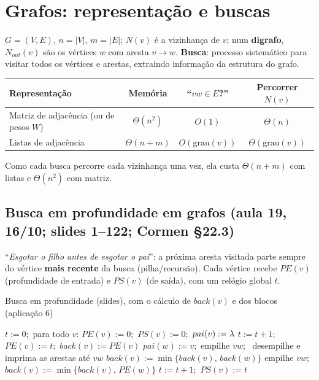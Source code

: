 \section{Grafos: representação e buscas}\label{sec:buscas}
$G=(V,E)$, $n=|V|$, $m=|E|$; $N(v)$ é a vizinhança de $v$; num \textbf{digrafo}, $N_{out}(v)$ são os vértices $w$ com aresta $v\to w$. \textbf{Busca}: processo sistemático para visitar todos os vértices e arestas, extraindo informação da estrutura do grafo.
\begin{center}\small
\begin{tabular}{@{}lccc@{}}
\toprule
Representação & Memória & ``$vw\in E$?'' & Percorrer $N(v)$\\
\midrule
Matriz de adjacência (ou de pesos $W$) & $\Theta(n^2)$ & $O(1)$ & $\Theta(n)$\\
Listas de adjacência & $\Theta(n+m)$ & $O(\text{grau}(v))$ & $\Theta(\text{grau}(v))$\\
\bottomrule
\end{tabular}
\end{center}
Como cada busca percorre cada vizinhança uma vez, ela custa $\Theta(n+m)$ com listas e $\Theta(n^2)$ com matriz.

\subsection{Busca em profundidade em grafos (aula 19, 16/10; slides 1--122; Cormen §22.3)}\label{sec:dfs}
``\emph{Esgotar o filho antes de esgotar o pai}'': a próxima aresta visitada parte sempre do vértice \textbf{mais recente} da busca (pilha/recursão). Cada vértice recebe $PE(v)$ (profundidade de entrada) e $PS(v)$ (de saída), com um relógio global $t$.
\begin{pseudo}{Busca em profundidade (slides), com o cálculo de $back(v)$ e dos blocos (aplicação 6)}
\begin{algorithmic}
  \State $t:=0$;\ para todo $v$: $PE(v):=0$;\ $PS(v):=0$;\ $pai(v):=\lambda$
    
  \EndWhile
\EndProcedure
{}
  \State $t:=t+1$;\ $PE(v):=t$;\ $back(v):=PE(v)$
     
      \State $pai(w):=v$;\ empilhe $vw$;\ 
       \State desempilhe e imprima as arestas até $vw$  \EndIf
      \State $back(v):=\min\{back(v),\,back(w)\}$
     
      \State empilhe $vw$;\ $back(v):=\min\{back(v),\,PE(w)\}$
    \EndIf
  \EndFor
  \State $t:=t+1$;\ $PS(v):=t$
\EndProcedure
\end{algorithmic}
\end{pseudo}

